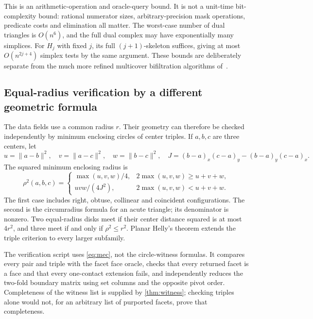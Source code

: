 This is an arithmetic-operation and oracle-query bound. It is not a unit-time bit-complexity bound: rational numerator sizes, arbitrary-precision mask operations, predicate costs and elimination all matter. The worst-case number of dual triangles is $O(n^6)$, and the full dual complex may have exponentially many simplices. For $H_j$ with fixed $j$, its full $(j+1)$-skeleton suffices, giving at most $O(n^{2j+4})$ simplex tests by the same argument. These bounds are deliberately separate from the much more refined multicover bifiltration algorithms of~\cite{corbet,alonso}.

\subsection{Equal-radius verification by a different geometric formula}
The data fields use a common radius $r$. Their geometry can therefore be checked independently by minimum enclosing circles of center triples. If $a,b,c$ are three centers, let
\[
u=\|a-b\|^2,\quad v=\|a-c\|^2,\quad w=\|b-c\|^2,
\quad J=(b-a)_x(c-a)_y-(b-a)_y(c-a)_x.
\]
The squared minimum enclosing radius is
\begin{equation}\label{eq:mec}
\rho^2(a,b,c)=
\begin{cases}
\max(u,v,w)/4,&2\max(u,v,w)\ge u+v+w,\\[2pt]
uvw/(4J^2),&2\max(u,v,w)<u+v+w.
\end{cases}
\end{equation}
The first case includes right, obtuse, collinear and coincident configurations. The second is the circumradius formula for an acute triangle; its denominator is nonzero. Two equal-radius disks meet if their center distance squared is at most $4r^2$, and three meet if and only if $\rho^2\le r^2$. Planar Helly's theorem extends the triple criterion to every larger subfamily.

The verification script uses \cref{eq:mec}, not the circle-witness formulas. It compares every pair and triple with the facet face oracle, checks that every returned facet is a face and that every one-contact extension fails, and independently reduces the two-fold boundary matrix using set columns and the opposite pivot order. Completeness of the witness list is supplied by \cref{thm:witness}; checking triples alone would not, for an arbitrary list of purported facets, prove that completeness.
